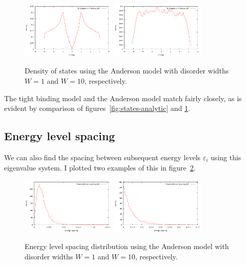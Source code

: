 \documentclass{revtex4}
\begin{document}
\begin{figure}[h!]
\includegraphics[width=0.4\textwidth]{anderson-states-W1.png}
\includegraphics[width=0.4\textwidth]{anderson-states-W10.png}
\caption{Density of states using the Anderson model with disorder widths $W=1$ and $W=10$, respectively.}
\label{fig:anderson-states}
\end{figure}

The tight binding model and the Anderson model match fairly closely, as is evident by comparison of figures~\ref{fig:states-analytic} and \ref{fig:anderson-states}.

\subsection{Energy level spacing}

We can also find the spacing between subsequent energy levels $\varepsilon_i$ using this eigenvalue system. I plotted two examples of this in figure~\ref{fig:anderson-spacing}.

\begin{figure}[h!]
\includegraphics[width=0.4\textwidth]{anderson-spacing-W1.png}
\includegraphics[width=0.4\textwidth]{anderson-spacing-W10.png}
\caption{Energy level spacing distribution using the Anderson model with disorder widths $W=1$ and $W=10$, respectively.}
\label{fig:anderson-spacing}
\end{figure}
\end{document}
